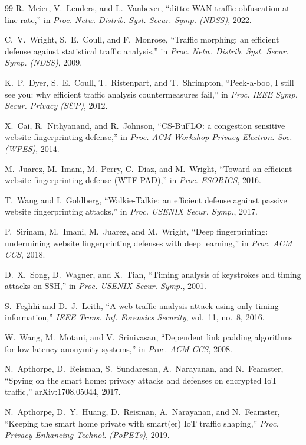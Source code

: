 \documentclass[10pt,a4paper,oneside]{article}
\begin{document}
\begin{thebibliography}{99}
 R.~Meier, V.~Lenders, and L.~Vanbever, ``ditto: {WAN} traffic
obfuscation at line rate,'' in \emph{Proc. Netw. Distrib. Syst. Secur. Symp. (NDSS)}, 2022.

 C.~V.~Wright, S.~E.~Coull, and F.~Monrose, ``Traffic morphing: an
efficient defense against statistical traffic analysis,'' in \emph{Proc. Netw. Distrib. Syst.
Secur. Symp. (NDSS)}, 2009.

 K.~P.~Dyer, S.~E.~Coull, T.~Ristenpart, and T.~Shrimpton,
``Peek-a-boo, I still see you: why efficient traffic analysis countermeasures fail,'' in
\emph{Proc. IEEE Symp. Secur. Privacy (S\&P)}, 2012.

 X.~Cai, R.~Nithyanand, and R.~Johnson, ``{CS-BuFLO}: a congestion
sensitive website fingerprinting defense,'' in \emph{Proc. ACM Workshop Privacy Electron. Soc.
(WPES)}, 2014.

 M.~Juarez, M.~Imani, M.~Perry, C.~Diaz, and M.~Wright, ``Toward an
efficient website fingerprinting defense ({WTF-PAD}),'' in \emph{Proc. ESORICS}, 2016.

 T.~Wang and I.~Goldberg, ``Walkie-Talkie: an efficient defense
against passive website fingerprinting attacks,'' in \emph{Proc. USENIX Secur. Symp.}, 2017.

 P.~Sirinam, M.~Imani, M.~Juarez, and M.~Wright, ``Deep fingerprinting:
undermining website fingerprinting defenses with deep learning,'' in \emph{Proc. ACM CCS},
2018.

 D.~X.~Song, D.~Wagner, and X.~Tian, ``Timing analysis of keystrokes
and timing attacks on {SSH},'' in \emph{Proc. USENIX Secur. Symp.}, 2001.

 S.~Feghhi and D.~J.~Leith, ``A web traffic analysis attack using
only timing information,'' \emph{IEEE Trans. Inf. Forensics Security}, vol.~11, no.~8, 2016.

 W.~Wang, M.~Motani, and V.~Srinivasan, ``Dependent link padding
algorithms for low latency anonymity systems,'' in \emph{Proc. ACM CCS}, 2008.

 N.~Apthorpe, D.~Reisman, S.~Sundaresan, A.~Narayanan, and
N.~Feamster, ``Spying on the smart home: privacy attacks and defenses on encrypted {IoT}
traffic,'' arXiv:1708.05044, 2017.

 N.~Apthorpe, D.~Y.~Huang, D.~Reisman, A.~Narayanan, and N.~Feamster,
``Keeping the smart home private with smart(er) {IoT} traffic shaping,'' \emph{Proc. Privacy
Enhancing Technol. (PoPETs)}, 2019.


\end{thebibliography}
\end{document}
